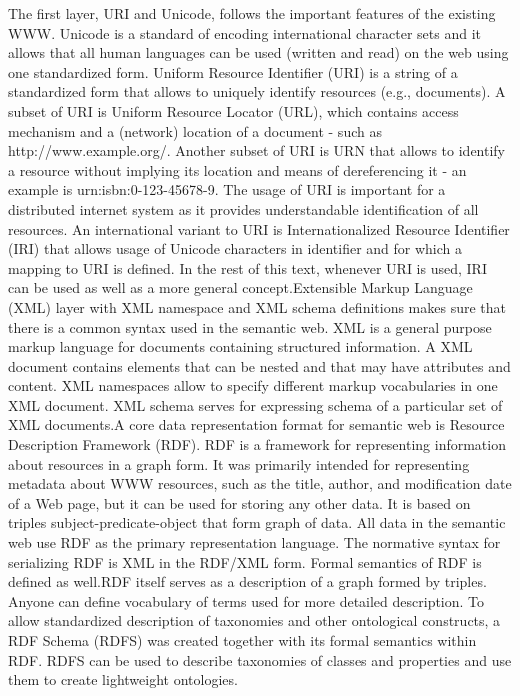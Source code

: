 \documentclass[a4paper,12pt,oneside]{report}
\begin{document}
{{{  The first layer, URI and Unicode, follows the important features of the existing WWW. Unicode is a standard of encoding international character sets and it allows that all human languages can be used (written and read) on the web using one standardized form. Uniform Resource Identifier (URI) is a string of a standardized form that allows to uniquely identify resources (e.g., documents). A subset of URI is Uniform Resource Locator (URL), which contains access mechanism and a (network) location of a document - such as http://www.example.org/. Another subset of URI is URN that allows to identify a resource without implying its location and means of dereferencing it - an example is urn:isbn:0-123-45678-9. The usage of URI is important for a distributed internet system as it provides understandable identification of all resources. An international variant to URI is Internationalized Resource Identifier (IRI) that allows usage of Unicode characters in identifier and for which a mapping to URI is defined. In the rest of this text, whenever URI is used, IRI can be used as well as a more general concept.Extensible Markup Language (XML) layer with XML namespace and XML schema definitions makes sure that there is a common syntax used in the semantic web. XML is a general purpose markup language for documents containing structured information. A XML document contains elements that can be nested and that may have attributes and content. XML namespaces allow to specify different markup vocabularies in one XML document. XML schema serves for expressing schema of a particular set of XML documents.A core data representation format for semantic web is Resource Description Framework (RDF). RDF is a framework for representing information about resources in a graph form. It was primarily intended for representing metadata about WWW resources, such as the title, author, and modification date of a Web page, but it can be used for storing any other data. It is based on triples subject-predicate-object that form graph of data. All data in the semantic web use RDF as the primary representation language. The normative syntax for serializing RDF is XML in the RDF/XML form. Formal semantics of RDF is defined as well.RDF itself serves as a description of a graph formed by triples. Anyone can define vocabulary of terms used for more detailed description. To allow standardized description of taxonomies and other ontological constructs, a RDF Schema (RDFS) was created together with its formal semantics within RDF. RDFS can be used to describe taxonomies of classes and properties and use them to create lightweight ontologies.
}}}
\end{document}

